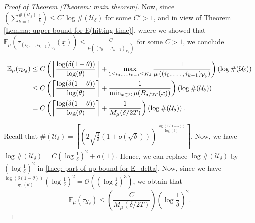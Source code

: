 \documentclass[11pt, reqno]{amsart}
\theoremstyle{plain}%
\theoremstyle{definition}
\theoremstyle{definition}
\def\U{\ensuremath{\mathcal U}}
\def\E{\mathbb E}
\def\ulx{\underline{x}}
\numberwithin{equation}{section}
\begin{document}
\begin{proof}[ Proof of Theorem \ref{Theorem: main theorem}]
Now, since $\left( \sum_{k=1}^{\#(\U_{\delta})}\frac{1}{k}\right)\le C' \log \#(\U_{\delta}) $ for some $C'>1$, and in view of Theorem \ref{Lemma: upper bound for E(hitting time)}, where we showed that $\E_\mu\left(\tau_{(i_0,\ldots,i_{k-1})_{\mathcal{V}_\delta}}(\ulx)\right)\le \frac{C}{\mu\left((i_0,\ldots,i_{k-1})_{\mathcal{V}_\delta}\right)}$ for some $C>1$, we conclude 

  \begin{align}
  \notag \E_\mu(\tau_\mathcal{U_\delta})&\le C\left(\left\lceil\frac{\log(\delta(1-\theta))}{\log(\theta)}\right\rceil+\max_{1\le i_0,\ldots,i_{k-1}\le K_{\delta}} \frac{1}{\mu\left((i_0,\ldots,i_{k-1})_{\mathcal{V}_\delta}\right)}\right)\left( \log \#(\U_{\delta}) \right)\\& \label{Ineq: before part of up bound for E_delta}
   \le C\left(\left\lceil\frac{\log(\delta(1-\theta))}{\log(\theta)}\right\rceil+ \frac{1}{ \min_{\ulx\in \Sigma} \mu(B_{\delta/2T}(\ulx))}\right)\left( \log \#(\U_{\delta}) \right)\\&\label{Ineq: part of up bound for E_delta}
    = C\left(\left\lceil\frac{\log(\delta(1-\theta))}{\log(\theta)}\right\rceil+ \frac{1}{ M_\mu(\delta/2T)}\right)\left( \log \#(\U_{\delta}) \right).
\end{align}

Recall that $\#(\U_{\delta})=\left\lceil\left(2\sqrt{\frac{1}{\delta}}\left(1+o\left(\sqrt{\delta}\right)\right)\right) ^ { \frac{\log(\delta(1-\theta))}{\log(\theta)}}\right\rceil$. Now, we have 
$\log \#(\U_{\delta})=C \left(\log \frac{1}{\delta}\right)^2+ o(1).$ Hence, we can replace $\log\#(\U_{\delta})$ by $\left(\log \frac{1}{\delta}\right)^2$ in \eqref{Ineq: part of up bound for E_delta}. Now, since we have $\frac{\log(\delta(1-\theta))}{\log(\theta)}\left(\log \frac{1}{\delta}\right)^2=\mathcal{O}\left(\left(\log \frac{1}{\delta}\right)^3\right)$, we obtain that 
$$ \E_\mu(\tau_\mathcal{U_\delta})\le \left(\frac{C}{ M_\mu(\delta/2T)}\right)\left(\log \frac{1}{\delta}\right)^2.$$



\end{proof}
\end{document}
